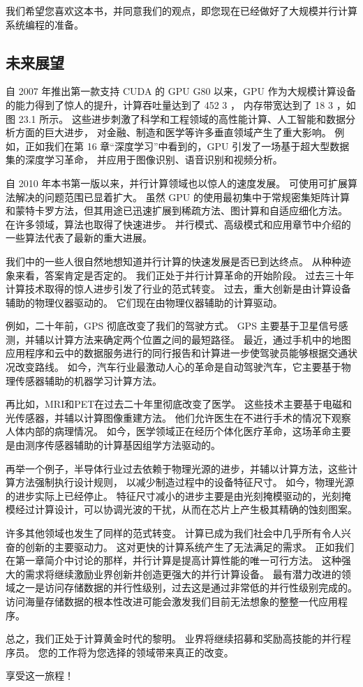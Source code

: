 我们希望您喜欢这本书，并同意我们的观点，即您现在已经做好了大规模并行计算系统编程的准备。

\subsection{未来展望}
自 2007 年推出第一款支持 CUDA 的 GPU G80 以来，GPU 作为大规模计算设备的能力得到了惊人的提升，计算吞吐量达到了 452 3 ，
内存带宽达到了 18 3 ，如图 23.1 所示。 这些进步刺激了科学和工程领域的高性能计算、人工智能和数据分析方面的巨大进步，
对金融、制造和医学等许多垂直领域产生了重大影响。 
例如，正如我们在第 16 章“深度学习”中看到的，GPU 引发了一场基于超大型数据集的深度学习革命，
并应用于图像识别、语音识别和视频分析。

自 2010 年本书第一版以来，并行计算领域也以惊人的速度发展。 可使用可扩展算法解决的问题范围已显着扩大。 
虽然 GPU 的使用最初集中于常规密集矩阵计算和蒙特卡罗方法，但其用途已迅速扩展到稀疏方法、图计算和自适应细化方法。 
在许多领域，算法也取得了快速进步。 并行模式、高级模式和应用章节中介绍的一些算法代表了最新的重大进展。

我们中的一些人很自然地想知道并行计算的快速发展是否已到达终点。 从种种迹象来看，答案肯定是否定的。 
我们正处于并行计算革命的开始阶段。 过去三十年计算技术取得的惊人进步引发了行业的范式转变。 
过去，重大创新是由计算设备辅助的物理仪器驱动的。 它们现在由物理仪器辅助的计算驱动。

例如，二十年前，GPS 彻底改变了我们的驾驶方式。 GPS 主要基于卫星信号感测，并辅以计算方法来确定两个位置之间的最短路径。 
最近，通过手机中的地图应用程序和云中的数据服务进行的同行报告和计算进一步使驾驶员能够根据交通状况改变路线。 
如今，汽车行业最激动人心的革命是自动驾驶汽车，它主要基于物理传感器辅助的机器学习计算方法。

再比如，MRI和PET在过去二十年里彻底改变了医学。 这些技术主要基于电磁和光传感器，并辅以计算图像重建方法。 
他们允许医生在不进行手术的情况下观察人体内部的病理情况。 
如今，医学领域正在经历个体化医疗革命，这场革命主要是由测序传感器辅助的计算基因组学方法驱动的。

再举一个例子，半导体行业过去依赖于物理光源的进步，并辅以计算方法，这些计算方法强制执行设计规则，
以减少制造过程中的设备特征尺寸。 如今，物理光源的进步实际上已经停止。 
特征尺寸减小的进步主要是由光刻掩模驱动的，光刻掩模经过计算设计，可以协调光波的干扰，从而在芯片上产生极其精确的蚀刻图案。

许多其他领域也发生了同样的范式转变。 计算已成为我们社会中几乎所有令人兴奋的创新的主要驱动力。 
这对更快的计算系统产生了无法满足的需求。 正如我们在第一章简介中讨论的那样，并行计算是提高计算性能的唯一可行方法。 
这种强大的需求将继续激励业界创新并创造更强大的并行计算设备。 
最有潜力改进的领域之一是访问存储数据的并行性级别，过去这是通过非常低的并行性级别完成的。 
访问海量存储数据的根本性改进可能会激发我们目前无法想象的整整一代应用程序。

总之，我们正处于计算黄金时代的黎明。 业界将继续招募和奖励高技能的并行程序员。 
您的工作将为您选择的领域带来真正的改变。

享受这一旅程！
